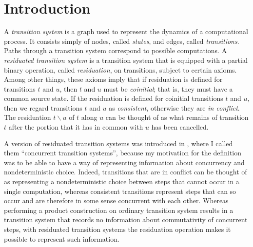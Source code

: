 \documentclass[11pt,notitlepage,a4paper]{report}
\newcommand\after{\backslash}
\begin{document}
\tableofcontents

\chapter{Introduction}

A {\em transition system} is a graph used to represent the dynamics of a computational
process.  It consists simply of nodes, called {\em states}, and edges, called {\em transitions}.
Paths through a transition system correspond to possible computations.
A {\em residuated transition system} is a transition system that is equipped with a
partial binary operation, called {\em residuation}, on transitions, subject to certain axioms.
Among other things, these axioms imply that if residuation is defined for transitions
$t$ and $u$, then $t$ and $u$ must be {\em coinitial}; that is, they must have a common
source state.
If the residuation is defined for coinitial transitions $t$ and $u$, then we regard
transitions $t$ and $u$ as {\em consistent}, otherwise they are {\em in conflict}.
The residuation $t \after u$ of $t$ along $u$ can be thought of as what remains of transition $t$
after the portion that it has in common with $u$ has been cancelled.

A version of residuated transition systems was introduced in \cite{cts}, where I called them
``concurrent transition systems'', because my motivation for the definition was to be
able to have a way of representing information about concurrency and nondeterministic choice.
Indeed, transitions that are in conflict can be thought of as representing a nondeterministic
choice between steps that cannot occur in a single computation, whereas consistent transitions
represent steps that can so occur and are therefore in some sense concurrent with each other.
Whereas performing a product construction on ordinary transition system results in a
transition system that records no information about commutativity of concurrent steps,
with residuated transition systems the residuation operation makes it possible to represent
such information.
\end{document}
